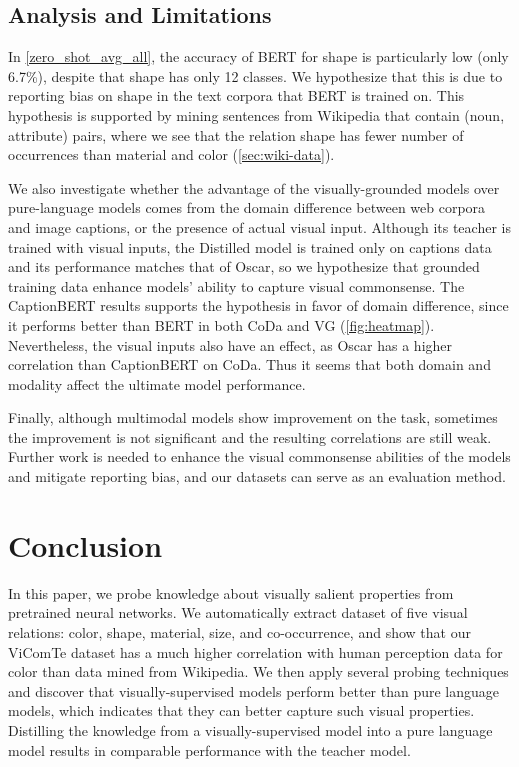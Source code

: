 \documentclass[11pt]{article}
\newcommand{\dataset}{ViComTe}
\begin{document}
\subsection{Analysis and Limitations}

In \cref{zero_shot_avg_all}, the accuracy of BERT for shape is particularly low (only 6.7\%), despite that shape has only 12 classes. We hypothesize that this is due to reporting bias on shape in the text corpora that BERT is trained on. This hypothesis is supported by mining sentences from Wikipedia that contain (noun, attribute) pairs, where we see that the relation shape has fewer number of occurrences than material and color (\cref{sec:wiki-data}).







We also investigate whether the advantage of the visually-grounded models over pure-language models comes from the domain difference between web corpora and image captions, or the presence of actual visual input. Although its teacher is trained with visual inputs, the Distilled model is trained only on captions data and its performance matches that of Oscar, so we hypothesize that grounded training data enhance models' ability to capture visual commonsense. 
The CaptionBERT results supports the hypothesis in favor of domain difference, since it performs better than BERT in both CoDa and VG (\cref{fig:heatmap}). Nevertheless, the visual inputs also have an effect, as Oscar has a higher correlation than CaptionBERT on CoDa.
Thus it seems that both domain and modality affect the ultimate model performance.

Finally, although multimodal models show improvement on the task, sometimes the improvement is not significant and the resulting correlations are still weak. Further work is needed to enhance the visual commonsense abilities of the models and mitigate reporting bias, and our datasets can serve as an evaluation method.




\section{Conclusion}

In this paper, we probe knowledge about visually salient properties from pretrained neural networks. We automatically extract dataset of five visual relations: color, shape, material, size, and co-occurrence, and show that our {\dataset} dataset has a much higher correlation with human perception data for color than data mined from Wikipedia. 
We then apply several probing techniques and discover that visually-supervised models perform better than pure language models, which indicates that they can better capture such visual properties. Distilling the knowledge from a visually-supervised model into a pure language model results in comparable performance with the teacher model.
\end{document}

